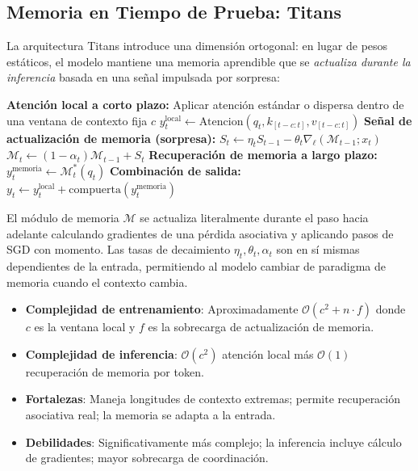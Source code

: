 \documentclass[11pt,a4paper]{article}
\begin{document}
\subsection{Memoria en Tiempo de Prueba: Titans}

La arquitectura Titans \citep{behrouz_titans_2025} introduce una dimensión ortogonal: en lugar de pesos estáticos, el modelo mantiene una memoria aprendible que se \textit{actualiza durante la inferencia} basada en una señal impulsada por sorpresa:

\begin{algorithmic}[1]
\State \textbf{Atención local a corto plazo:} Aplicar atención estándar o dispersa dentro de una ventana de contexto fija $c$
\State $y_t^{\text{local}} \gets \text{Atencion}(q_t, k_{[t-c:t]}, v_{[t-c:t]})$
\State \textbf{Señal de actualización de memoria (sorpresa):}
\State $S_t \gets \eta_t S_{t-1} - \theta_t \nabla_\ell(\mathcal{M}_{t-1}; x_t)$ 
\State $\mathcal{M}_t \gets (1 - \alpha_t) \mathcal{M}_{t-1} + S_t$ 
\State \textbf{Recuperación de memoria a largo plazo:}
\State $y_t^{\text{memoria}} \gets \mathcal{M}_t^* (q_t)$ 
\State \textbf{Combinación de salida:}
\State $y_t \gets y_t^{\text{local}} + \text{compuerta}(y_t^{\text{memoria}})$ 
\end{algorithmic}

El módulo de memoria $\mathcal{M}$ se actualiza literalmente durante el paso hacia adelante calculando gradientes de una pérdida asociativa y aplicando pasos de SGD con momento. Las tasas de decaimiento $\eta_t, \theta_t, \alpha_t$ son en sí mismas dependientes de la entrada, permitiendo al modelo cambiar de paradigma de memoria cuando el contexto cambia.

\begin{itemize}[leftmargin=*]
    \item \textbf{Complejidad de entrenamiento}: Aproximadamente $\mathcal{O}(c^2 + n \cdot f)$ donde $c$ es la ventana local y $f$ es la sobrecarga de actualización de memoria.
    \item \textbf{Complejidad de inferencia}: $\mathcal{O}(c^2)$ atención local más $\mathcal{O}(1)$ recuperación de memoria por token.
    \item \textbf{Fortalezas}: Maneja longitudes de contexto extremas; permite recuperación asociativa real; la memoria se adapta a la entrada.
    \item \textbf{Debilidades}: Significativamente más complejo; la inferencia incluye cálculo de gradientes; mayor sobrecarga de coordinación.
\end{itemize}
\end{document}
